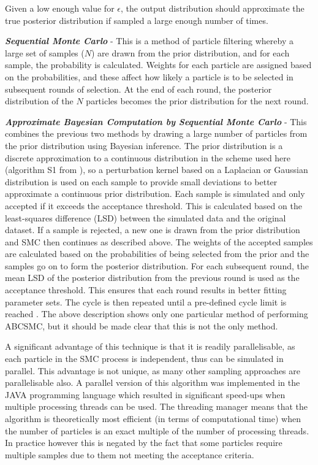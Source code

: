 Given a low enough value for $\epsilon$, the output distribution should approximate the true posterior distribution if sampled a large enough number of times.

\textbf{\textit{Sequential Monte Carlo}} - This is a method of particle filtering whereby a large set of samples ($N$) are drawn from the prior distribution, and for each sample, the probability is calculated. Weights for each particle are assigned based on the probabilities, and these affect how likely a particle is to be selected in subsequent rounds of selection. At the end of each round, the posterior distribution of the $N$ particles becomes the prior distribution for the next round.

\textbf{\textit{Approximate Bayesian Computation by Sequential Monte Carlo}} - This combines the previous two methods by drawing a large number of particles from the prior distribution using Bayesian inference. The prior distribution is a discrete approximation to a continuous distribution in the scheme used here (algorithm S1 from \citet{Toni2009}), so a perturbation kernel based on a Laplacian or Gaussian distribution is used on each sample to provide small deviations to better approximate a continuous prior distribution. Each sample is simulated and only accepted if it exceeds the acceptance threshold. This is calculated based on the least-squares difference (LSD) between the simulated data and the original dataset. If a sample is rejected, a new one is drawn from the prior distribution and SMC then continues as described above. The weights of the accepted samples are calculated based on the probabilities of being selected from the prior and the samples go on to form the posterior distribution. For 
each subsequent round, the mean LSD of the
posterior distribution from the previous round is used as the acceptance threshold. This ensures that each round results in better fitting parameter sets. The cycle is then repeated until a pre-defined cycle limit is reached \cite{Toni2009}. The above description shows only one particular method of performing ABCSMC, but it should be made clear that this is not the only method.

A significant advantage of this technique is that it is readily parallelisable, as each particle in the SMC process is independent, thus can be simulated in parallel. This advantage is not unique, as many other sampling approaches are parallelisable also. A parallel version of this algorithm was implemented in the JAVA programming language which resulted in significant speed-ups when multiple processing threads can be used. The threading manager means that the algorithm is theoretically most efficient (in terms of computational time) when the number of particles is an exact multiple of the number of processing threads. In practice however this is negated by the fact that some particles require multiple samples due to them not meeting the acceptance criteria.

